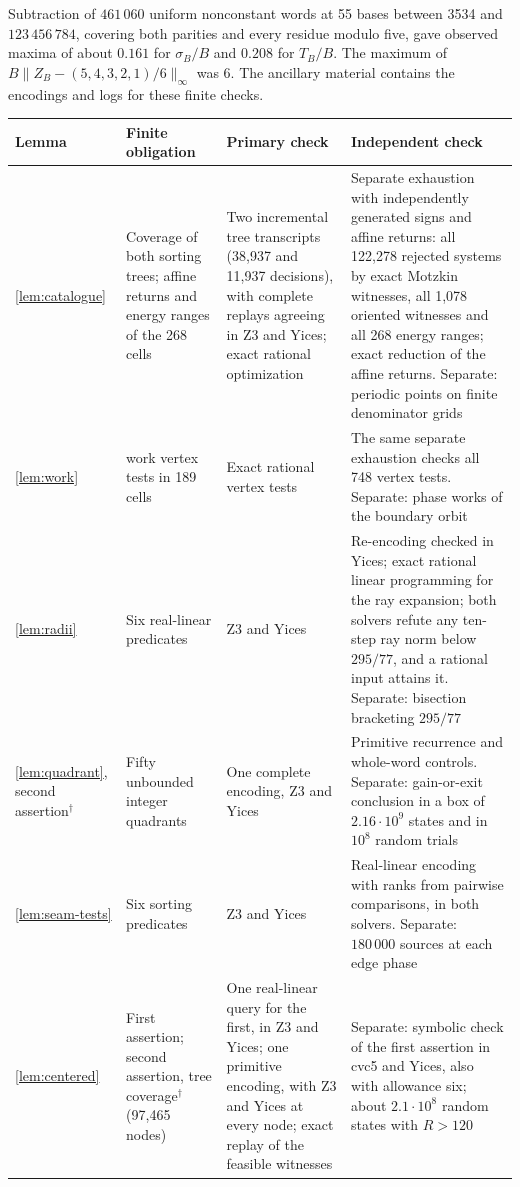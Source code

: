 \documentclass[11pt,reqno]{amsart}
\theoremstyle{remark}
\begin{document}
Subtraction of \(461\,060\) uniform nonconstant words at 55 bases
between 3534 and \(123\,456\,784\), covering both parities and every
residue modulo five, gave observed maxima of about \(0.161\) for
\(\sigma_B/B\) and \(0.208\) for \(T_B/B\). The maximum of
\(B\|Z_B-(5,4,3,2,1)/6\|_\infty\) was 6. The ancillary
material contains the encodings and logs for these finite checks.

\begin{table}[htbp]
\footnotesize
\setlength{\tabcolsep}{3pt}
\renewcommand{\arraystretch}{1.15}
\begin{tabular}{@{}>{\raggedright\arraybackslash}p{1.5cm}>{\raggedright\arraybackslash}p{3.1cm}>{\raggedright\arraybackslash}p{4.1cm}>{\raggedright\arraybackslash}p{5.95cm}@{}}
\hline
Lemma & Finite obligation & Primary check & Independent check\\
\hline
\ref{lem:catalogue} & Coverage of both sorting trees; affine returns and energy ranges of the 268 cells & Two incremental tree transcripts (38,937 and 11,937 decisions), with complete replays agreeing in Z3 and Yices; exact rational optimization & Separate exhaustion with independently generated signs and affine returns: all 122,278 rejected systems by exact Motzkin witnesses, all 1,078 oriented witnesses and all 268 energy ranges; exact reduction of the affine returns. Separate: periodic points on finite denominator grids\\
\ref{lem:work} & 748 work vertex tests in 189 cells & Exact rational vertex tests & The same separate exhaustion checks all 748 vertex tests. Separate: phase works of the boundary orbit\\
\ref{lem:radii} & Six real-linear predicates & Z3 and Yices & Re-encoding checked in Yices; exact rational linear programming for the ray expansion; both solvers refute any ten-step ray norm below \(295/77\), and a rational input attains it. Separate: bisection bracketing \(295/77\)\\
\ref{lem:quadrant}, second assertion\(^\dagger\) & Fifty unbounded integer quadrants & One complete encoding, Z3 and Yices & Primitive recurrence and whole-word controls. Separate: gain-or-exit conclusion in a box of \(2.16\cdot10^9\) states and in \(10^8\) random trials\\
\ref{lem:seam-tests} & Six sorting predicates & Z3 and Yices & Real-linear encoding with ranks from pairwise comparisons, in both solvers. Separate: \(180\,000\) sources at each edge phase\\
\ref{lem:centered} & First assertion; second assertion, tree coverage\(^\dagger\) (97,465 nodes) & One real-linear query for the first, in Z3 and Yices; one primitive encoding, with Z3 and Yices at every node; exact replay of the feasible witnesses & Separate: symbolic check of the first assertion in cvc5 and Yices, also with allowance six; about \(2.1\cdot10^8\) random states with \(R>120\)\\

\end{tabular}
\end{table}
\end{document}
